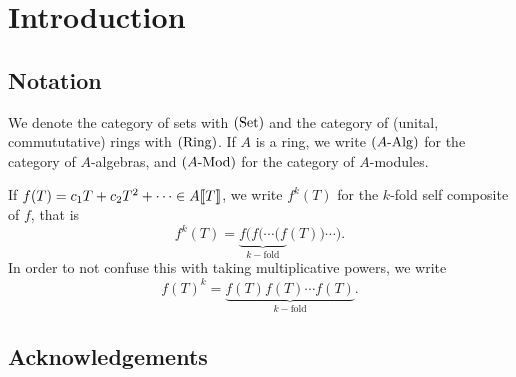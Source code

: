 \documentclass[../main.tex]{subfiles}
\begin{document}
\section{Introduction} %
\label{sec:Introduction}

\subsection{Notation} %
\label{sub:Notation}
We denote the category of sets with ${(\mathrm{Set})}$ and the category of (unital,
commututative) rings with ${(\mathrm{Ring})}$. If $A$ is a ring, we write ${({A}\text-\mathrm{Alg})}$ for the
category of $A$-algebras, and ${({A}\text-\mathrm{Mod})}$ for the category of $A$-modules. 

If $f(T) = c_1 T + c_2 T^2 + \dots \in A\llbracket T \rrbracket$, we write 
$f^k(T)$ for the $k$-fold self composite of $f$, that is
\begin{equation*}
  f^k(T) = \underbrace{f(f( \cdots (f}_{k-\text{fold}}(T)) \cdots).
\end{equation*}
In order to not confuse this with taking multiplicative powers, we write
\begin{equation*}
  f(T)^k = \underbrace{f(T) f(T) \cdots f(T)}_{k-\text{fold}}.
\end{equation*}

\subsection{Acknowledgements} %
\label{sub:Acknowledgements}

\end{document}
